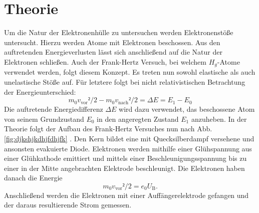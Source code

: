 
\section{Theorie}
\label{sec:Theorie}
Um die Natur der Elektronenhülle zu untersuchen werden Elektronenstöße untersucht.
Hierzu werden Atome mit Elektronen beschossen. Aus den auftretenden Energieverlusten
lässt sich anschließend auf die Natur der Elektronen schließen. Auch der Frank-Hertz
Versuch, bei welchem $H_g$-Atome verwendet werden,
folgt diesem Konzept. Es treten nun sowohl elastische als auch unelastische Stöße auf.
Für letztere folgt bei nicht relativistischen Betrachtung der Energieunterschied:
\begin{equation}
  m_0 v_\text{vor}²/2 - m_0 v_\text{nach}²/2 = \Delta E = E_1 - E_0
  \end{equation}
Die auftretende Energiedifferenz $\Delta E$ wird dazu verwendet, das beschossene
Atom von seinem Grundzustand $E_0$ in den angeregten Zustand $E_1$ anzuheben.
In der Theorie folgt der Aufbau des Frank-Hertz Versuches nun nach Abb.
\ref{fig:djkshjkdhjfdhjfk} . Den Kern bildet eine mit Quecksilberdampf versehene und ansonsten evakuierte
Diode. Elektronen werden mithilfe einer Glühspannung aus einer Glühkathode emittiert
und mittels einer Beschleunigungsspannung bis zu einer in der Mitte angebrachten
Elektrode beschleunigt. Die Elektronen haben danach die Energie
\begin{equation}
  m_0 v_\text{vor}²/2 = e_0 U_\text{B}\text{.}
  \end{equation}
   Anschließend werden die Elektronen mit einer Auffängerelektrode
gefangen und der daraus resultierende Strom gemessen.
